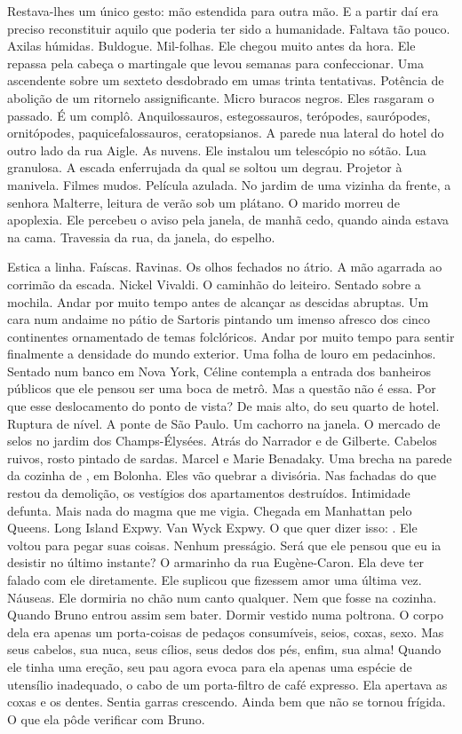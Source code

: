 Restava-lhes um único gesto: mão estendida para outra mão. E a partir
daí era preciso reconstituir aquilo que poderia ter sido a humanidade.
Faltava tão pouco. Axilas húmidas. Buldogue. Mil-folhas. Ele chegou
muito antes da hora. Ele repassa pela cabeça o martingale que levou
semanas para confeccionar. Uma ascendente sobre um sexteto desdobrado em
umas trinta tentativas. Potência de abolição de um ritornelo
assignificante. Micro buracos negros. Eles rasgaram o passado. É um
complô. Anquilossauros, estegossauros, terópodes, saurópodes,
ornitópodes, paquicefalossauros, ceratopsianos. A parede nua lateral do
hotel do outro lado da rua Aigle. As nuvens. Ele instalou um telescópio
no sótão. Lua granulosa. A escada enferrujada da qual se soltou um
degrau. Projetor à manivela. Filmes mudos. Película azulada. No jardim
de uma vizinha da frente, a senhora Malterre, leitura de verão sob um
plátano. O marido morreu de apoplexia. Ele percebeu o aviso pela janela,
de manhã cedo, quando ainda estava na cama. Travessia da rua, da janela,
do espelho.

Estica a linha. Faíscas. Ravinas. Os olhos fechados no átrio. A mão
agarrada ao corrimão da escada. Nickel Vivaldi. O caminhão do leiteiro.
Sentado sobre a mochila. Andar por muito tempo antes de alcançar as
descidas abruptas. Um cara num andaime no pátio de Sartoris pintando um
imenso afresco dos cinco continentes ornamentado de temas folclóricos.
Andar por muito tempo para sentir finalmente a densidade do mundo
exterior. Uma folha de louro em pedacinhos. Sentado num banco em Nova
York, Céline contempla a entrada dos banheiros públicos que ele pensou
ser uma boca de metrô. Mas a questão não é essa. Por que esse
deslocamento do ponto de vista? De mais alto, do seu quarto de hotel.
Ruptura de nível. A ponte de São Paulo. Um cachorro na janela. O mercado
de selos no jardim dos Champs-Élysées. Atrás do Narrador e de Gilberte.
Cabelos ruivos, rosto pintado de sardas. Marcel e Marie Benadaky. Uma
brecha na parede da cozinha de , em Bolonha. Eles vão quebrar a
divisória. Nas fachadas do que restou da demolição, os vestígios dos
apartamentos destruídos. Intimidade defunta. Mais nada do magma que me
vigia. Chegada em Manhattan pelo Queens. Long Island Expwy. Van Wyck
Expwy. O que quer dizer isso: . Ele voltou para pegar suas coisas.
Nenhum presságio. Será que ele pensou que eu ia desistir no último
instante? O armarinho da rua Eugène-Caron. Ela deve ter falado com ele
diretamente. Ele suplicou que fizessem amor uma última vez. Náuseas. Ele
dormiria no chão num canto qualquer. Nem que fosse na cozinha. Quando
Bruno entrou assim sem bater. Dormir vestido numa poltrona. O corpo dela
era apenas um porta-coisas de pedaços consumíveis, seios, coxas, sexo.
Mas seus cabelos, sua nuca, seus cílios, seus dedos dos pés, enfim, sua
alma! Quando ele tinha uma ereção, seu pau agora evoca para ela apenas
uma espécie de utensílio inadequado, o cabo de um porta-filtro de café
expresso. Ela apertava as coxas e os dentes. Sentia garras crescendo.
Ainda bem que não se tornou frígida. O que ela pôde verificar com Bruno.

